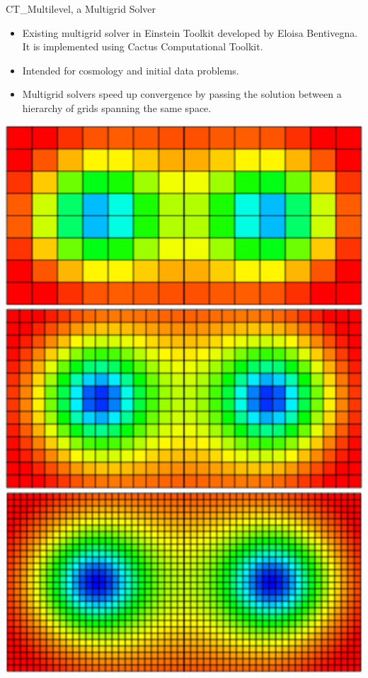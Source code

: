 \documentclass{beamer}
\begin{document}

\begin{frame}{CT\_Multilevel, a Multigrid Solver}\small
\begin{itemize}
    \item Existing multigrid solver in Einstein Toolkit developed by Eloisa Bentivegna. It is implemented using Cactus Computational Toolkit.
    \item Intended for cosmology and initial data problems.
    \item Multigrid solvers speed up convergence by passing the solution between a hierarchy of grids spanning the same space.
    
\end{itemize}
\begin{center}
    \includegraphics[scale=0.17]{grid0003.png}
    \includegraphics[scale=0.17]{grid0004.png} \\
    \includegraphics[scale=0.17]{grid0005.png}
\end{center}


\end{frame}
\end{document}
